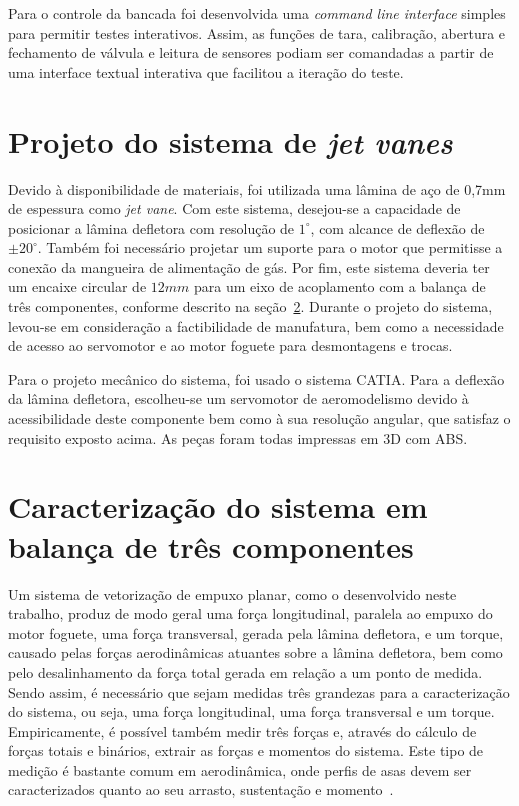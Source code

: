 Para o controle da bancada foi desenvolvida uma \textit{command line interface} simples para permitir testes interativos. Assim, as funções de tara, calibração, abertura e fechamento de válvula e leitura de sensores podiam ser comandadas a partir de uma interface textual interativa que facilitou a iteração do teste.

\section{Projeto do sistema de \textit{jet vanes}}\label{sec:method_jet_vanes}

Devido à disponibilidade de materiais, foi utilizada uma lâmina de aço de 0,7mm de espessura como \textit{jet vane}. Com este sistema, desejou-se a capacidade de posicionar a lâmina defletora com resolução de \(1^\circ \), com alcance de deflexão de \(\pm 20^\circ \). Também foi necessário projetar um suporte para o motor que permitisse a conexão da mangueira de alimentação de gás. Por fim, este sistema deveria ter um encaixe circular de \(12mm\) para um eixo de acoplamento com a balança de três componentes, conforme descrito na seção~\ref{sec:method_3axis_measurement}. Durante o projeto do sistema, levou-se em consideração a factibilidade de manufatura, bem como a necessidade de acesso ao servomotor e ao motor foguete para desmontagens e trocas.

Para o projeto mecânico do sistema, foi usado o sistema CATIA\@. Para a deflexão da lâmina defletora, escolheu-se um servomotor de aeromodelismo devido à acessibilidade deste componente bem como à sua resolução angular, que satisfaz o requisito exposto acima. As peças foram todas impressas em 3D com ABS\@.

\section{Caracterização do sistema em balança de três componentes}\label{sec:method_3axis_measurement}

Um sistema de vetorização de empuxo planar, como o desenvolvido neste trabalho, produz de modo geral uma força longitudinal, paralela ao empuxo do motor foguete, uma força transversal, gerada pela lâmina defletora, e um torque, causado pelas forças aerodinâmicas atuantes sobre a lâmina defletora, bem como pelo desalinhamento da força total gerada em relação a um ponto de medida. Sendo assim, é necessário que sejam medidas três grandezas para a caracterização do sistema, ou seja, uma força longitudinal, uma força transversal e um torque. Empiricamente, é possível também medir três forças e, através do cálculo de forças totais e binários, extrair as forças e momentos do sistema. Este tipo de medição é bastante comum em aerodinâmica, onde perfis de asas devem ser caracterizados quanto ao seu arrasto, sustentação e momento~\cite{anderson}.

